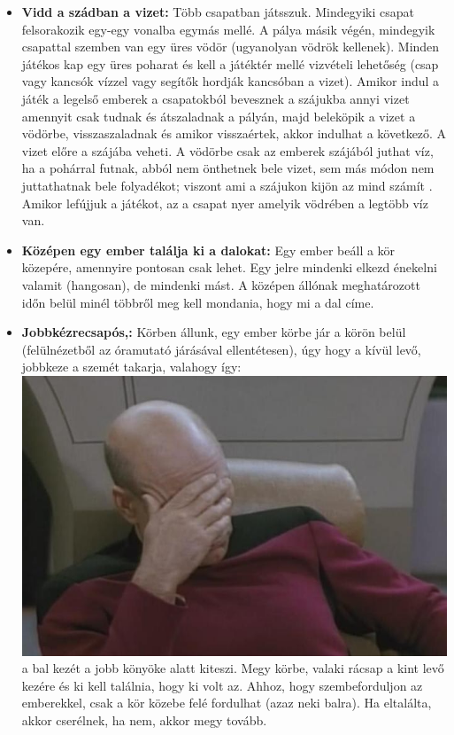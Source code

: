 \documentclass[a4paper, 12pt, twoside, openright]{article}
\begin{document}
\begin{itemize}
\item \textbf{Vidd a szádban a vizet:} Több csapatban játsszuk. Mindegyiki csapat felsorakozik egy-egy vonalba egymás mellé. A pálya másik végén, mindegyik csapattal szemben van egy üres vödör (ugyanolyan vödrök kellenek). Minden játékos kap egy üres poharat és kell a játéktér mellé vizvételi lehetőség (csap vagy kancsók vízzel vagy segítők hordják kancsóban a vizet). Amikor indul a játék a legelső emberek a csapatokból bevesznek a szájukba annyi vizet amennyit csak tudnak és átszaladnak a pályán, majd beleköpik a vizet a vödörbe, visszaszaladnak és amikor visszaértek, akkor indulhat a következő. A vizet előre a szájába veheti. A vödörbe csak az emberek szájából juthat víz, ha a pohárral futnak, abból nem önthetnek bele vizet, sem más módon nem juttathatnak bele folyadékot; viszont ami a szájukon kijön az mind számít \Smiley. Amikor lefújjuk a játékot, az a csapat nyer amelyik vödrében a legtöbb víz van.

\item \textbf{Középen egy ember találja ki a dalokat:} Egy ember beáll a kör közepére, amennyire pontosan csak lehet. Egy jelre mindenki elkezd énekelni valamit (hangosan), de mindenki mást. A középen állónak meghatározott időn belül minél többről meg kell mondania, hogy mi a dal címe.


\item \textbf{Jobbkézrecsapós,:} Körben állunk, egy ember körbe jár a körön belül (felülnézetből az óramutató járásával ellentétesen), úgy hogy a kívül levő, jobbkeze a szemét takarja, valahogy így:\\
\includegraphics[scale=0.65]{picard-facepalm.jpg}\\
a bal kezét a jobb könyöke alatt kiteszi. Megy körbe, valaki rácsap a kint levő kezére és ki kell találnia, hogy ki volt az. Ahhoz, hogy szembeforduljon az emberekkel, csak a kör közebe felé fordulhat (azaz neki balra). Ha eltalálta, akkor cserélnek, ha nem, akkor megy tovább.


\end{itemize}
\end{document}
